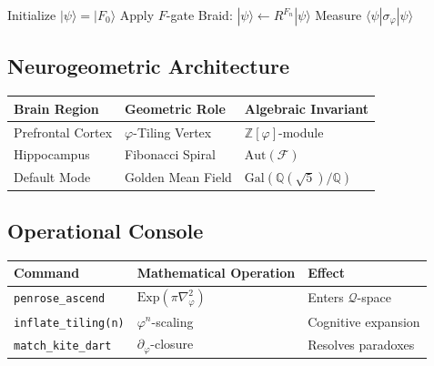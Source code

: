 \documentclass[12pt]{article}
\begin{document}
\begin{algorithm}[H]
\caption{Golden Cognition Protocol}
\begin{algorithmic}[1]
\State Initialize \( |\psi\rangle = |F_0\rangle \)
    \State Apply \( F \)-gate
    \State Braid: \( |\psi\rangle \leftarrow R^{F_n} |\psi\rangle \)
    \State Measure \( \langle \psi | \sigma_\varphi | \psi \rangle \)
\EndFor
\end{algorithmic}
\end{algorithm}

\subsection{Neurogeometric Architecture}

\begin{table}[h]
\centering
\begin{tabular}{|l|l|l|}
\hline
\textbf{Brain Region} & \textbf{Geometric Role} & \textbf{Algebraic Invariant} \\ \hline
Prefrontal Cortex & \( \varphi \)-Tiling Vertex & \( \mathbb{Z}[\varphi] \)-module \\ \hline
Hippocampus & Fibonacci Spiral & \( \text{Aut}(\mathcal{F}) \) \\ \hline
Default Mode & Golden Mean Field & \( \text{Gal}(\mathbb{Q}(\sqrt{5})/\mathbb{Q}) \) \\ \hline
\end{tabular}
\end{table}

\subsection{Operational Console}

\begin{table}[h]
\centering
\begin{tabular}{|l|l|l|}
\hline
\textbf{Command} & \textbf{Mathematical Operation} & \textbf{Effect} \\ \hline
\texttt{penrose\_ascend} & \( \text{Exp}(\pi \nabla^2_\varphi) \) & Enters \( \mathcal{Q} \)-space \\ \hline
\texttt{inflate\_tiling(n)} & \( \varphi^n \)-scaling & Cognitive expansion \\ \hline
\texttt{match\_kite\_dart} & \( \partial_\varphi \)-closure & Resolves paradoxes \\ \hline
\end{tabular}
\end{table}
\end{document}
